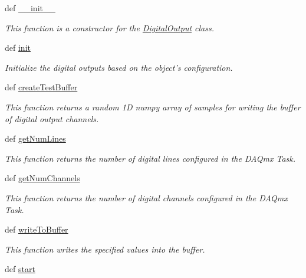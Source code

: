 \begin{DoxyCompactItemize}
def \hyperlink{class_digital_output_1_1_digital_output_a481e24aa22a2a7d516dd79e3460eb8dd}{\-\_\-\-\_\-init\-\_\-\-\_\-}
\begin{DoxyCompactList}\small\item\em This function is a constructor for the \hyperlink{class_digital_output_1_1_digital_output}{Digital\-Output} class. \end{DoxyCompactList}\item 
def \hyperlink{class_digital_output_1_1_digital_output_a35dd7e77a58e88f8cc0d02aaede8d6b0}{init}
\begin{DoxyCompactList}\small\item\em Initialize the digital outputs based on the object's configuration. \end{DoxyCompactList}\item 
def \hyperlink{class_digital_output_1_1_digital_output_aa888e91f47efed1049fd310373bd4fc9}{create\-Test\-Buffer}
\begin{DoxyCompactList}\small\item\em This function returns a random 1\-D numpy array of samples for writing the buffer of digital output channels. \end{DoxyCompactList}\item 
def \hyperlink{class_digital_output_1_1_digital_output_a0f143fe8af789b6623c3c9f4428c8514}{get\-Num\-Lines}
\begin{DoxyCompactList}\small\item\em This function returns the number of digital lines configured in the D\-A\-Qmx Task. \end{DoxyCompactList}\item 
def \hyperlink{class_digital_output_1_1_digital_output_a30a645662a4b0baa31990ed244cd91cc}{get\-Num\-Channels}
\begin{DoxyCompactList}\small\item\em This function returns the number of digital channels configured in the D\-A\-Qmx Task. \end{DoxyCompactList}\item 
def \hyperlink{class_digital_output_1_1_digital_output_a74440e738ee87a0b70a8388acba28c11}{write\-To\-Buffer}
\begin{DoxyCompactList}\small\item\em This function writes the specified values into the buffer. \end{DoxyCompactList}\item 
def \hyperlink{class_digital_output_1_1_digital_output_aff1c266b07a91eb42a96f4d394405d6b}{start}

\end{DoxyCompactItemize}
